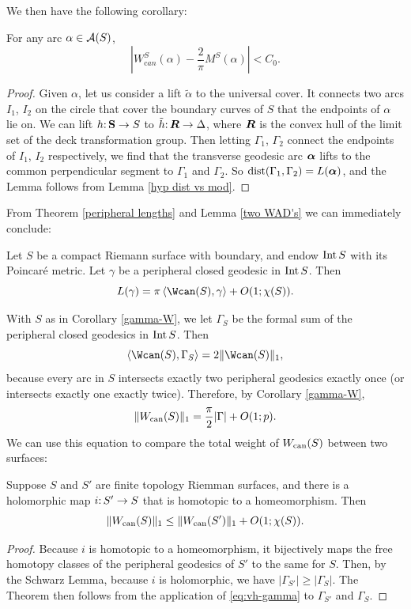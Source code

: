 We then have the following corollary:

\begin{lem} \label{two WAD's}
For any arc $\alpha \in \AA(S)$,
$$
|W_{\mathrm can}^S(\alpha) -\frac{2}{\pi} M^S(\alpha)| < C_0.
$$
\end{lem}

\begin{proof}
Given $\alpha$,
let us consider a lift $\tilde \alpha$ to the universal cover.
It connects two arcs $I_1$, $I_2$ on the circle
that cover the boundary curves of $S$ that the endpoints of $\alpha$ lie on.
We can lift $h\from \mathbf S \to S$ to $\tilde h\from \core R \to \D$,
where $\core R$ is the convex hull of the limit set of the deck transformation group.
Then letting $\Gamma_1$, $\Gamma_2$ connect the endpoints
 of $I_1$, $I_2$ respectively,
we find that the transverse geodesic arc $\bfalpha$
 lifts to the common perpendicular segment to $\Gamma_1$ and $\Gamma_2$.
So $\dist(\Gamma_1, \Gamma_2) = L(\bfalpha)$,
and the Lemma follows from Lemma \ref{hyp dist vs mod}.
\end{proof}
From Theorem \ref{peripheral lengths} and Lemma \ref{two WAD's} we can immediately conclude:
\begin{corollary} \label{gamma-W}
Let $S$ be a compact Riemann surface with boundary,
and endow $\Int S$ with its Poincar\'e metric.
Let $\gamma$ be a peripheral closed geodesic in $\Int S$.
Then
$$
L(\gamma) = \pi \pairing{ \Wcan(S), \gamma } + O(1; \chi(S)).
$$
\end{corollary}
With $S$ as in Corollary \ref{gamma-W},
we let $\Gamma_S$ be the formal sum of the peripheral closed geodesics in $\Int S$.
Then
$$
\pairing{ \Wcan(S), \Gamma_S } = 2 \norm{\Wcan(S)}_1,
$$
because every arc in $S$ intersects exactly two peripheral geodesics exactly once (or intersects exactly one exactly twice). 
Therefore,
by Corollary \ref{gamma-W},
\begin{equation} \label{eq:vh-gamma}
\norm{\wcan(S)}_1 = \frac\pi 2 |\Gamma| + O(1; p). 
\end{equation}
We can use this equation to compare the total weight of $\wcan(S)$ between two surfaces:
\begin{theorem} \label{thm:total-increase}
Suppose $S$ and $S'$ are finite topology Riemman surfaces,
and there is a holomorphic map $i \from S' \to S$ that is homotopic to a homeomorphism.
Then
$$
\norm{\wcan(S)}_1 \le \norm{\wcan(S')}_1 + O(1; \chi(S)).
$$
\end{theorem}
\begin{proof}
Because $i$ is homotopic to a homeomorphism,
it bijectively maps the free homotopy classes of the peripheral geodesics of $S'$ to the same for $S$.
Then, 
by the Schwarz Lemma,
because $i$ is holomorphic,
we have $|\Gamma_{S'}| \ge |\Gamma_S|$.
The Theorem then follows from the application of \eqref{eq:vh-gamma} to $\Gamma_{S'}$ and $\Gamma_S$. 
\end{proof}



